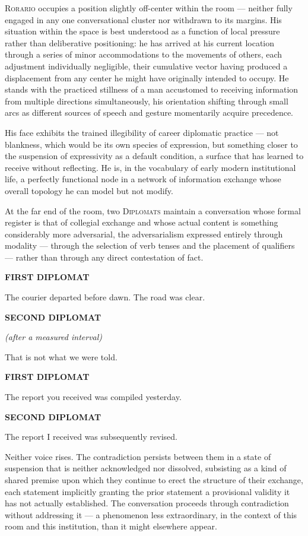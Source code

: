\documentclass[12pt, oneside]{article}
\newenvironment{action}{%
  \vspace{0.6em}%
  \noindent\ignorespaces%
}{%
  \par\vspace{0.6em}%
}
\newcommand{\character}[1]{%
  \vspace{0.8em}%
  \begin{center}%
    \bfseries\MakeUppercase{#1}%
  \end{center}%
  \vspace{-0.3em}%
}
\newcommand{\paren}[1]{%
  \begin{center}%
    \itshape (#1)%
  \end{center}%
  \vspace{-0.3em}%
}
\newenvironment{dialogue}{%
  \vspace{0.2em}%
  \begin{list}{}{%
    \setlength{\leftmargin}{1.2in}%
    \setlength{\rightmargin}{0.8in}%
    \setlength{\itemsep}{0.6em}%
    \setlength{\parsep}{0pt}%
  }%
}{%
  \end{list}%
  \vspace{0.4em}%
}
\newcommand{\says}[2]{%
  \character{#1}%
  \begin{dialogue}\item #2\end{dialogue}%
}
\newcommand{\saysp}[3]{%
  \character{#1}%
  \paren{#2}%
  \begin{dialogue}\item #3\end{dialogue}%
}
\begin{document}
\begin{action}
\textsc{Rorario} occupies a position slightly off-center within the room --- neither fully engaged in any one conversational cluster nor withdrawn to its margins. His situation within the space is best understood as a function of local pressure rather than deliberative positioning: he has arrived at his current location through a series of minor accommodations to the movements of others, each adjustment individually negligible, their cumulative vector having produced a displacement from any center he might have originally intended to occupy. He stands with the practiced stillness of a man accustomed to receiving information from multiple directions simultaneously, his orientation shifting through small arcs as different sources of speech and gesture momentarily acquire precedence.

His face exhibits the trained illegibility of career diplomatic practice --- not blankness, which would be its own species of expression, but something closer to the suspension of expressivity as a default condition, a surface that has learned to receive without reflecting. He is, in the vocabulary of early modern institutional life, a perfectly functional node in a network of information exchange whose overall topology he can model but not modify.
\end{action}

\begin{action}
At the far end of the room, two \textsc{Diplomats} maintain a conversation whose formal register is that of collegial exchange and whose actual content is something considerably more adversarial, the adversarialism expressed entirely through modality --- through the selection of verb tenses and the placement of qualifiers --- rather than through any direct contestation of fact.
\end{action}

\says{First Diplomat}{The courier departed before dawn. The road was clear.}

\saysp{Second Diplomat}{after a measured interval}{That is not what we were told.}

\says{First Diplomat}{The report you received was compiled yesterday.}

\says{Second Diplomat}{The report I received was subsequently revised.}

\begin{action}
Neither voice rises. The contradiction persists between them in a state of suspension that is neither acknowledged nor dissolved, subsisting as a kind of shared premise upon which they continue to erect the structure of their exchange, each statement implicitly granting the prior statement a provisional validity it has not actually established. The conversation proceeds through contradiction without addressing it --- a phenomenon less extraordinary, in the context of this room and this institution, than it might elsewhere appear.
\end{action}
\end{document}
